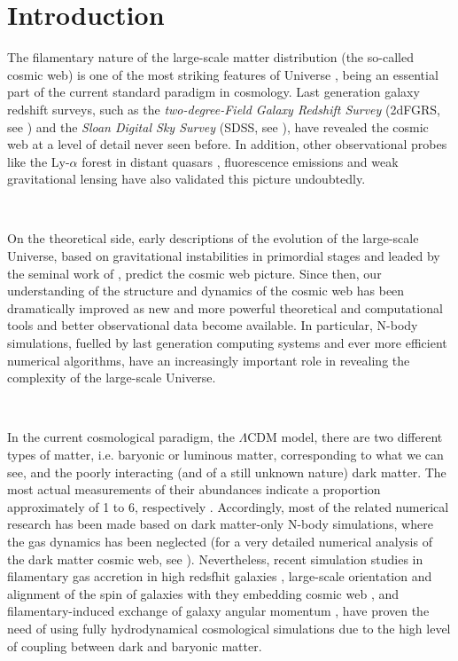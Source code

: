 \documentclass[a4,useAMS,usenatbib,usegraphicx,12pt]{article}
\begin{document}
\newpage

\section{Introduction}


The filamentary nature of the large-scale matter distribution (the so-called 
cosmic web) is one of the most striking features of Universe \citep{Bond96}, 
being an essential part of the current standard paradigm in cosmology. Last 
generation galaxy redshift surveys, such as the \textit{two-degree-Field Galaxy 
Redshift Survey} (2dFGRS, see \citet{Colless03}) and the \textit{Sloan Digital 
Sky Survey} (SDSS, see \citet{Abazajian09}), have revealed the cosmic web at a 
level of detail never seen before. In addition, other observational probes like
the Ly-$\alpha$ forest in distant quasars \citep{Rauch98, Cantalupo14}, 
fluorescence emissions \citep{Cantalupo12} and weak gravitational lensing 
\citep{Massey07, Dietrich12} have also validated this picture undoubtedly.

\

On the theoretical side, early descriptions of the evolution of the large-scale
Universe, based on gravitational instabilities in primordial stages and leaded 
by the seminal work of \citet{Zeldovich70}, predict the cosmic web picture. 
Since then, our understanding of the structure and dynamics of the cosmic web 
has been dramatically improved as new and more powerful theoretical and 
computational tools and better observational data become available. In 
particular, N-body simulations, fuelled by last generation computing systems 
and ever more efficient numerical algorithms, have an increasingly important 
role in revealing the complexity of the large-scale Universe.

\

In the current cosmological paradigm, the $\Lambda$CDM model, there are two 
different types of matter, i.e. baryonic or luminous matter, corresponding 
to what we can see, and the poorly interacting (and of a still unknown nature) 
dark matter. The most actual measurements of their abundances indicate a 
proportion approximately of 1 to 6, respectively \citep{Planck13XVI}. 
Accordingly, most of the related numerical research has been made based on 
dark matter-only N-body simulations, where the gas dynamics has been 
neglected (for a very detailed numerical analysis of the dark matter cosmic 
web, see \citet{Cautun14}). Nevertheless, recent simulation studies in 
filamentary gas accretion in high redsfhit galaxies \citep{Dekel09}, 
large-scale orientation and alignment of the spin of galaxies with they 
embedding cosmic web \citep{Hahn10}, and filamentary-induced exchange of 
galaxy angular momentum \citep{Dubois14}, have proven the need of using 
fully hydrodynamical cosmological simulations due to the high level of coupling
between dark and baryonic matter.
\end{document}
